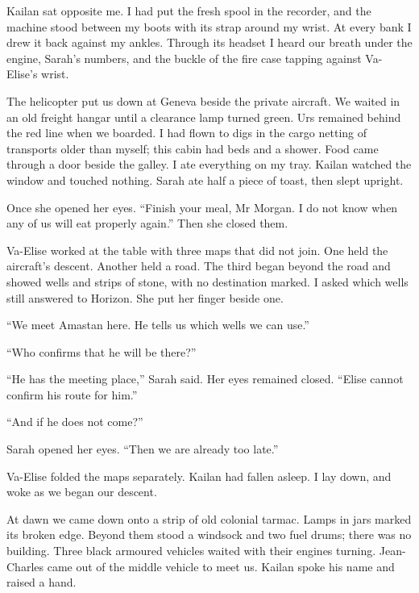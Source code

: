 Kailan sat opposite me. I had put the fresh spool in the recorder, and the machine stood between my boots with its strap around my wrist. At every bank I drew it back against my ankles. Through its headset I heard our breath under the engine, Sarah's numbers, and the buckle of the fire case tapping against Va-Elise's wrist.\par

The helicopter put us down at Geneva beside the private aircraft. We waited in an old freight hangar until a clearance lamp turned green. Urs remained behind the red line when we boarded. I had flown to digs in the cargo netting of transports older than myself; this cabin had beds and a shower. Food came through a door beside the galley. I ate everything on my tray. Kailan watched the window and touched nothing. Sarah ate half a piece of toast, then slept upright.\par

Once she opened her eyes. ``Finish your meal, Mr Morgan. I do not know when any of us will eat properly again.'' Then she closed them.\par

Va-Elise worked at the table with three maps that did not join. One held the aircraft's descent. Another held a road. The third began beyond the road and showed wells and strips of stone, with no destination marked. I asked which wells still answered to Horizon. She put her finger beside one.\par

``We meet Amastan here. He tells us which wells we can use.''\par

``Who confirms that he will be there?''\par

``He has the meeting place,'' Sarah said. Her eyes remained closed. ``Elise cannot confirm his route for him.''\par

``And if he does not come?''\par

Sarah opened her eyes. ``Then we are already too late.''\par

Va-Elise folded the maps separately. Kailan had fallen asleep. I lay down, and woke as we began our descent.\par

\ornament

At dawn we came down onto a strip of old colonial tarmac. Lamps in jars marked its broken edge. Beyond them stood a windsock and two fuel drums; there was no building. Three black armoured vehicles waited with their engines turning. Jean-Charles came out of the middle vehicle to meet us. Kailan spoke his name and raised a hand.\par

